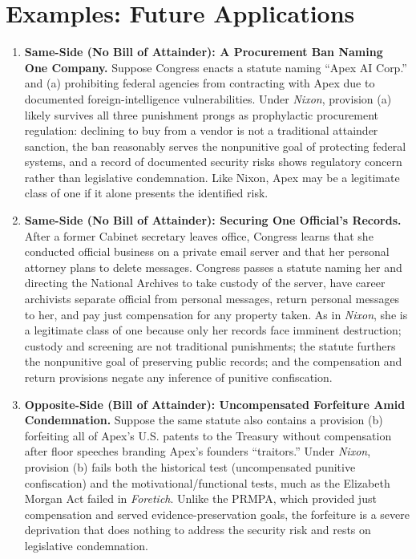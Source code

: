 \documentclass[12pt]{article}
\begin{document}
\section{Examples: Future Applications}
\begin{enumerate}

\item \textbf{Same-Side (No Bill of Attainder): A Procurement Ban Naming One Company.} Suppose Congress enacts a statute naming ``Apex AI Corp.'' and (a) prohibiting federal agencies from contracting with Apex due to documented foreign-intelligence vulnerabilities. Under \textit{Nixon}, provision (a) likely survives all three punishment prongs as prophylactic procurement regulation: declining to buy from a vendor is not a traditional attainder sanction, the ban reasonably serves the nonpunitive goal of protecting federal systems, and a record of documented security risks shows regulatory concern rather than legislative condemnation. Like Nixon, Apex may be a legitimate class of one if it alone presents the identified risk.

\item \textbf{Same-Side (No Bill of Attainder): Securing One Official's Records.} After a former Cabinet secretary leaves office, Congress learns that she conducted official business on a private email server and that her personal attorney plans to delete messages. Congress passes a statute naming her and directing the National Archives to take custody of the server, have career archivists separate official from personal messages, return personal messages to her, and pay just compensation for any property taken. As in \textit{Nixon}, she is a legitimate class of one because only her records face imminent destruction; custody and screening are not traditional punishments; the statute furthers the nonpunitive goal of preserving public records; and the compensation and return provisions negate any inference of punitive confiscation.

\item \textbf{Opposite-Side (Bill of Attainder): Uncompensated Forfeiture Amid Condemnation.} Suppose the same statute also contains a provision (b) forfeiting all of Apex's U.S. patents to the Treasury without compensation after floor speeches branding Apex's founders ``traitors.'' Under \textit{Nixon}, provision (b) fails both the historical test (uncompensated punitive confiscation) and the motivational/functional tests, much as the Elizabeth Morgan Act failed in \textit{Foretich}. Unlike the PRMPA, which provided just compensation and served evidence-preservation goals, the forfeiture is a severe deprivation that does nothing to address the security risk and rests on legislative condemnation.


\end{enumerate}
\end{document}

